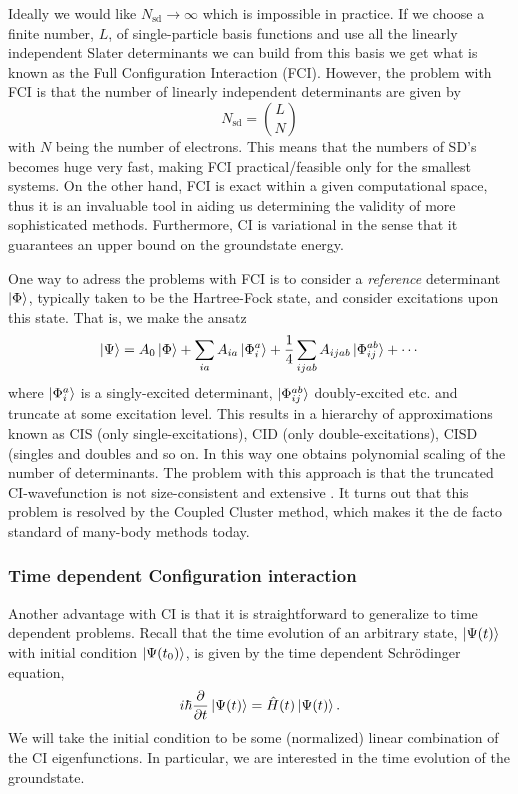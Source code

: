 \documentclass[aip,jcp,reprint,floatfix]{revtex4-1}
\begin{document}
Ideally we would like $N_{\text{sd}} \rightarrow \infty$ which is
impossible in practice. If we choose a finite number, $L$, of
single-particle basis functions and use all the linearly independent
Slater determinants we can build from this basis we get what is known
as the Full Configuration Interaction (FCI). However, the problem with
FCI is that the number of linearly independent determinants are given
by
\begin{equation}
 N_{\text{sd}} = \binom{L}{N}
\end{equation}
with $N$ being the number of electrons. This means that the numbers of
SD's becomes huge very fast, making FCI practical/feasible only for
the smallest systems. On the other hand, FCI is exact within a given
computational space, thus it is an invaluable tool in aiding us
determining the validity of more sophisticated methods. Furthermore,
CI is variational in the sense that it guarantees an upper bound on
the groundstate energy.

One way to adress the problems with FCI is to consider a
\textit{reference} determinant $\ket{\Phi}$, typically taken to be the
Hartree-Fock state, and consider excitations upon this state. That is,
we make the ansatz
\begin{equation}
 \ket{\Psi} = A_0 \ket{\Phi} + \sum_{ia} A_{ia} \ket{\Phi_{i}^a} + \frac{1}{4} \sum_{ijab} A_{ijab} \ket{\Phi_{ij}^{ab}} + \cdots
\end{equation}
where $\ket{\Phi_i^a}$ is a singly-excited determinant,
$\ket{\Phi_{ij}^{ab}}$ doubly-excited etc. and truncate at some
excitation level.  This results in a hierarchy of approximations known
as CIS (only single-excitations), CID (only double-excitations), CISD
(singles and doubles and so on. In this way one obtains polynomial
scaling of the number of determinants. The problem with this approach
is that the truncated CI-wavefunction is not size-consistent and
extensive \cite{Helgaker00book}. It turns out that this problem is
resolved by the Coupled Cluster method, which makes it the de facto
standard of many-body methods today.

\subsubsection{Time dependent Configuration interaction}
Another advantage with CI is that it is straightforward to generalize
to time dependent problems. Recall that the time evolution of an
arbitrary state, $\ket{\Psi(t)}$ with initial condition
$\ket{\Psi(t_0)}$, is given by the time dependent Schrödinger
equation,
\begin{equation}
 i \hbar \frac{\partial}{\partial t}\ket{\Psi(t)} = \hat{H}(t) \ket{\Psi(t)}.
\end{equation}
We will take the initial condition to be some (normalized) linear
combination of the CI eigenfunctions. In particular, we are interested
in the time evolution of the groundstate.
\end{document}
